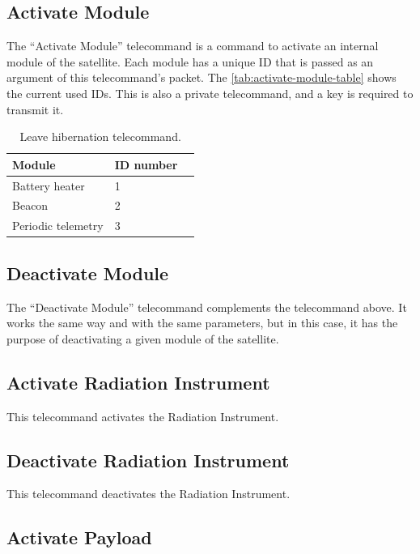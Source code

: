 \subsection{Activate Module}

The ``Activate Module'' telecommand is a command to activate an internal module of the satellite. Each module has a unique ID that is passed as an argument of this telecommand's packet. The \autoref{tab:activate-module-table} shows the current used IDs.
This is also a private telecommand, and a key is required to transmit it.

\begin{table}[!ht]
    \centering
    \begin{tabular}{lll}
        \toprule[1.5pt]
        \textbf{Module}     & \textbf{ID number} \\
        \midrule
        Battery heater      & 1 \\
        Beacon              & 2 \\
        Periodic telemetry  & 3 \\
        \bottomrule[1.5pt]
    \end{tabular}
    \caption{Leave hibernation telecommand.}
    \label{tab:activate-module-table}
\end{table}

\subsection{Deactivate Module}

The ``Deactivate Module'' telecommand complements the telecommand above. It works the same way and with the same parameters, but in this case, it has the purpose of deactivating a given module of the satellite.

\subsection{Activate Radiation Instrument}

This telecommand activates the Radiation Instrument.

\subsection{Deactivate Radiation Instrument}

This telecommand deactivates the Radiation Instrument.

\subsection{Activate Payload}


